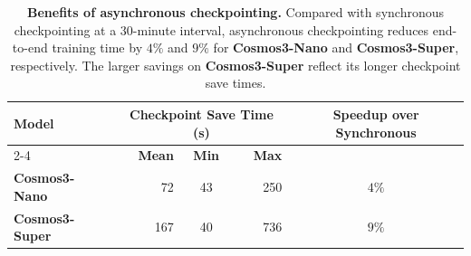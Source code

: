 \begin{table}[t]
    \centering
    \caption{\textbf{Benefits of asynchronous checkpointing.} Compared with synchronous checkpointing at a 30-minute interval, asynchronous checkpointing reduces end-to-end training time by $4\%$ and $9\%$ for \textbf{Cosmos3-Nano} and \textbf{Cosmos3-Super}, respectively. The larger savings on \textbf{Cosmos3-Super} reflect its longer checkpoint save times.}
    \label{tab:cosmos3_checkpointing}
    \setlength{\tabcolsep}{6pt}
    \small
    \begin{tabular}{l|rcr|c}
        \toprule
        \multirow{2}{*}{\textbf{Model}}
            & \multicolumn{3}{c|}{\textbf{Checkpoint Save Time (s)}}
            & \multirow{2}{*}{\textbf{Speedup over Synchronous}} \\
        \cmidrule(lr){2-4}
            & \textbf{Mean} & \textbf{Min} & \textbf{Max} & \\
        \midrule
        \textbf{Cosmos3-Nano}  &  72 & 43 & 250 & $4\%$ \\
        \textbf{Cosmos3-Super} & 167 & 40 & 736 & $9\%$ \\
        \bottomrule
    \end{tabular}
\end{table}
